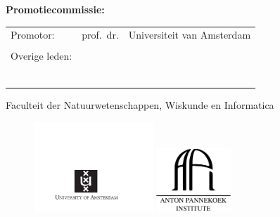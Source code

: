 \clearpage



{\bf\normalsize Promotiecommissie:} \\[0.2cm]

\begin{tabular}{@{}lll}
     Promotor:      & prof.~dr.   & Universiteit van Amsterdam\\
					&									&	                         \\
	Overige leden:	&  & \\
                    &  & \\
                    &  & \\
                    &  & \\

                    &  & \\
                    &  & \\
                    &  &

\end{tabular}

\vspace*{0.2cm}
Faculteit der Natuurwetenschappen, Wiskunde en Informatica

\vspace*{\fill}

\begin{figure}[!h]
\includegraphics[width=0.4\textwidth]{gfx/titlepage/UvA_logo.pdf}
\hspace{4cm}
\includegraphics[width=0.25\textwidth]{gfx/titlepage/API_logo.pdf}
\end{figure}

